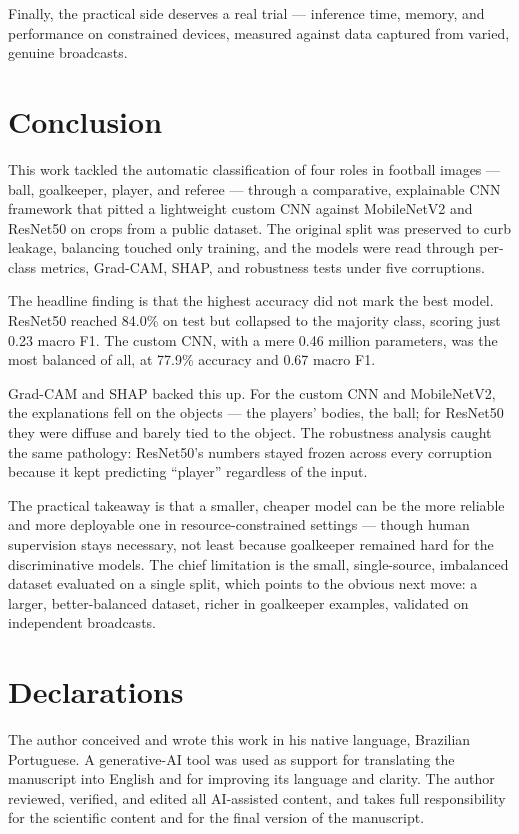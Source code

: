 \documentclass[preprint,12pt]{elsarticle}
\begin{document}
Finally, the practical side deserves a real trial --- inference time, memory, and performance on constrained devices, measured against data captured from varied, genuine broadcasts.

\section{Conclusion}
\label{sec:conclusion}

This work tackled the automatic classification of four roles in football images --- ball, goalkeeper, player, and referee --- through a comparative, explainable CNN framework that pitted a lightweight custom CNN against MobileNetV2 and ResNet50 on crops from a public dataset. The original split was preserved to curb leakage, balancing touched only training, and the models were read through per-class metrics, Grad-CAM, SHAP, and robustness tests under five corruptions.

The headline finding is that the highest accuracy did not mark the best model. ResNet50 reached 84.0\% on test but collapsed to the majority class, scoring just 0.23 macro F1. The custom CNN, with a mere 0.46 million parameters, was the most balanced of all, at 77.9\% accuracy and 0.67 macro F1.

Grad-CAM and SHAP backed this up. For the custom CNN and MobileNetV2, the explanations fell on the objects --- the players' bodies, the ball; for ResNet50 they were diffuse and barely tied to the object. The robustness analysis caught the same pathology: ResNet50's numbers stayed frozen across every corruption because it kept predicting ``player'' regardless of the input.

The practical takeaway is that a smaller, cheaper model can be the more reliable and more deployable one in resource-constrained settings --- though human supervision stays necessary, not least because goalkeeper remained hard for the discriminative models. The chief limitation is the small, single-source, imbalanced dataset evaluated on a single split, which points to the obvious next move: a larger, better-balanced dataset, richer in goalkeeper examples, validated on independent broadcasts.

\section*{Declarations}
The author conceived and wrote this work in his native language, Brazilian Portuguese. A generative-AI tool was used as support for translating the manuscript into English and for improving its language and clarity.
The author reviewed, verified, and edited all AI-assisted content, and takes full responsibility for the scientific content and for the final version of the manuscript.



\end{document}
